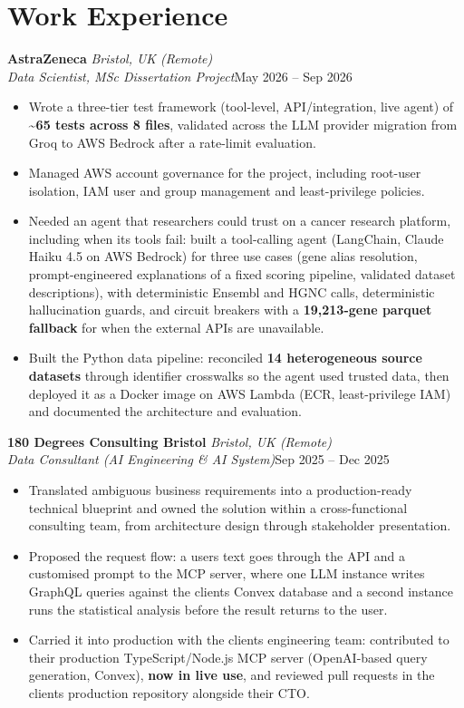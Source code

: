\documentclass[a4paper,11pt]{article}
\newcommand{\role}[4]{%
  \textbf{#1}{\color{muted}\,\textperiodcentered\,\textit{#2}}\\
  \textit{#4}\hfill{\color{muted}#3}\par}
\newcommand{\gap}{\vspace{5pt}}
\newcommand{\num}[1]{\textbf{#1}}   %
\begin{document}
\section{Work Experience}
\role{AstraZeneca}{Bristol, UK (Remote)}{May 2026 – Sep 2026}{Data Scientist, MSc Dissertation Project}
\begin{itemize}
  \item Wrote a three-tier test framework (tool-level, API/integration, live agent) of \num{\textasciitilde{}65 tests across 8 files}, validated across the LLM provider migration from Groq to AWS Bedrock after a rate-limit evaluation.
  \item Managed AWS account governance for the project, including root-user isolation, IAM user and group management and least-privilege policies.
  \item Needed an agent that researchers could trust on a cancer research platform, including when its tools fail: built a tool-calling agent (LangChain, Claude Haiku 4.5 on AWS Bedrock) for three use cases (gene alias resolution, prompt-engineered explanations of a fixed scoring pipeline, validated dataset descriptions), with deterministic Ensembl and HGNC calls, deterministic hallucination guards, and circuit breakers with a \num{19,213-gene parquet fallback} for when the external APIs are unavailable.
  \item Built the Python data pipeline: reconciled \num{14 heterogeneous source datasets} through identifier crosswalks so the agent used trusted data, then deployed it as a Docker image on AWS Lambda (ECR, least-privilege IAM) and documented the architecture and evaluation.
\end{itemize}
\gap
{}
\role{180 Degrees Consulting Bristol}{Bristol, UK (Remote)}{Sep 2025 – Dec 2025}{Data Consultant (AI Engineering \& AI System)}
\begin{itemize}
  \item Translated ambiguous business requirements into a production-ready technical blueprint and owned the solution within a cross-functional consulting team, from architecture design through stakeholder presentation.
  \item Proposed the request flow: a user\textquotesingle{}s text goes through the API and a customised prompt to the MCP server, where one LLM instance writes GraphQL queries against the client\textquotesingle{}s Convex database and a second instance runs the statistical analysis before the result returns to the user.
  \item Carried it into production with the client\textquotesingle{}s engineering team: contributed to their production TypeScript/Node.js MCP server (OpenAI-based query generation, Convex), \num{now in live use}, and reviewed pull requests in the client\textquotesingle{}s production repository alongside their CTO.
\end{itemize}
\end{document}
